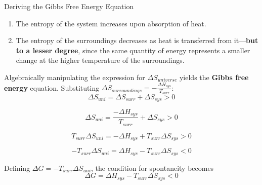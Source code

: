 \documentclass[10pt]{article}
\begin{document}
\begin{core}{Deriving the Gibbs Free Energy Equation}
\begin{enumerate}[label=(\arabic*)]
        \item The entropy of the system increases upon absorption of heat.

        \item The entropy of the surroundings decreases as heat is transferred from it---\textbf{but to a lesser degree}, since the same quantity of energy represents a smaller change at the higher temperature of the surroundings.

      \end{enumerate}

      Algebraically manipulating the expression for $\Delta S_{universe}$ yields the \textbf{Gibbs free energy} equation. Substituting $\Delta S_{surroundings} = -\frac{\Delta H_{sys}}{T_{surr}}$:
      \[
        \Delta S_{uni} = \Delta S_{surr} + \Delta S_{sys} > 0
      \]

      \[
        \Delta S_{uni} = \frac{-\Delta H_{sys}}{T_{surr}} + \Delta S_{sys} > 0
      \]

      \[
        T_{surr}\Delta S_{uni} = -\Delta H_{sys} + T_{surr}\Delta S_{sys} > 0
      \]

      \[
        -T_{surr}\Delta S_{uni} = \Delta H_{sys} - T_{surr}\Delta S_{sys} < 0
      \]

      Defining $\Delta G = -T_{surr}\Delta S_{uni}$, the condition for spontaneity becomes
      \[
        \Delta G = \Delta H_{sys} - T_{surr}\Delta S_{sys} < 0
      \]

    \end{core}
\end{document}
